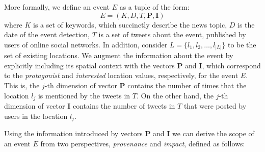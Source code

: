 More formally, we define an event $E$ as a tuple of the form:
%
\begin{equation} \label{eq:event}
E = (K, D, T, \mathbf{P}, \mathbf{I})
\end{equation}
%
\noindent where $K$ is  a set of keywords, which succinctly describe the news
topic, $D$ is the date of the event detection, $T$ is a set of tweets about the
event, published by users of online social networks.
In addition, consider $L=\{l_1, l_2,\ldots, l_{|L|}\}$ to be the set of existing
locations. 
%
We augment the information about the event by explicitly including its spatial
context with the vectors $\mathbf{P}$ and $\mathbf{I}$, which correspond to the
{\em protagonist} and {\em interested} location values, respectively, for the
event $E$. 
%
This is, the $j$-th dimension of vector $\mathbf{P}$ contains the number of
times that the location $l_j$ is mentioned by the tweets in $T$. 
%
On the other hand, the $j$-th dimension of vector $\mathbf{I}$ contains the
number of tweets in $T$ that were posted by users in the location $l_j$.


Using the information introduced by vectors $\mathbf{P}$ and $\mathbf{I}$ we can
derive the scope of an event $E$ from two perspectives, {\em provenance} and
{\em impact}, defined as follows:

